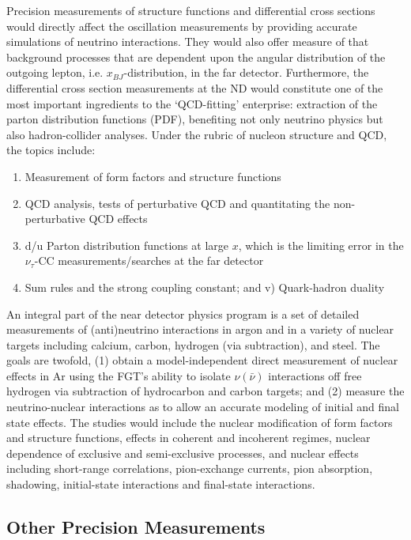 Precision measurements of structure functions and differential cross
sections would directly affect the oscillation measurements by
providing accurate simulations of neutrino interactions. They would
also offer measure of that background processes that are dependent
upon the angular distribution of the outgoing lepton,
i.e. $x_{BJ}$-distribution, in the far detector.  Furthermore, the
differential cross section measurements at the ND would constitute one
of the most important ingredients to the `QCD-fitting' enterprise:
extraction of the parton distribution functions (PDF), benefiting not
only neutrino physics but also hadron-collider analyses.  Under the
rubric of nucleon structure and QCD, the topics include:
\begin{enumerate}
\item Measurement of form factors and structure functions
\item QCD analysis,  tests of perturbative QCD and quantitating the non-perturbative 
QCD effects
\item d/u Parton distribution functions at large $x$, which is the limiting error in the 
$\nu_\tau$-CC measurements/searches at the far detector
\item Sum rules and the strong coupling constant; and v) Quark-hadron duality
\end{enumerate}

An integral part of the near detector physics program is a set of
detailed measurements of (anti)neutrino interactions in argon and in a
variety of nuclear targets including calcium, carbon, hydrogen (via
subtraction), and steel.  The goals are
twofold, (1) obtain a model-independent direct measurement of nuclear
effects in Ar using the FGT's ability to isolate $\nu (\bar \nu)$
interactions off free hydrogen via subtraction of hydrocarbon and
carbon targets; and (2) measure the neutrino-nuclear interactions as
to allow an accurate modeling of initial and final state effects. The
studies would include the nuclear modification of form factors and
structure functions, effects in coherent and incoherent regimes,
nuclear dependence of exclusive and semi-exclusive processes, and
nuclear effects including short-range correlations, pion-exchange
currents, pion absorption, shadowing, initial-state interactions and
final-state interactions.

\subsection{Other Precision Measurements}

